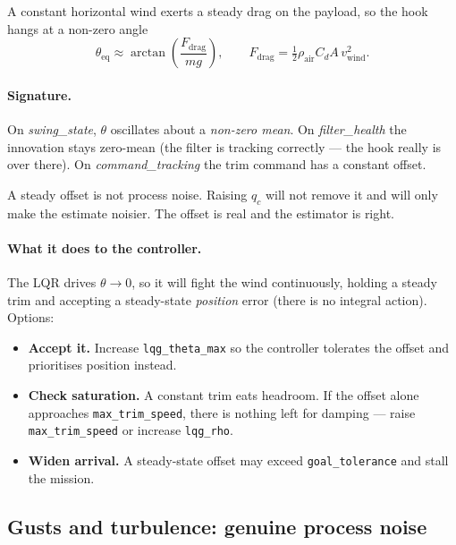 \documentclass[11pt,a4paper]{article}
\newcommand{\param}[1]{\texttt{\small #1}}
\newcommand{\plot}[1]{\textit{#1}}
\begin{document}
A constant horizontal wind exerts a steady drag on the payload, so the hook
hangs at a non-zero angle
%
\begin{equation}
\theta_{\text{eq}} \approx \arctan\!\left(\frac{F_{\text{drag}}}{m g}\right),
\qquad
F_{\text{drag}} = \tfrac{1}{2}\rho_{\text{air}} C_d A\, v_{\text{wind}}^2 .
\end{equation}

\paragraph{Signature.} On \plot{swing\_state}, $\theta$ oscillates about a
\emph{non-zero mean}. On \plot{filter\_health} the innovation stays zero-mean
(the filter is tracking correctly --- the hook really is over there). On
\plot{command\_tracking} the trim command has a constant offset.

\begin{tcolorbox}[colback=orange!5,colframe=orange!55!black,title=\textbf{Do not ``fix'' this with \param{qc}},fonttitle=\bfseries\small]
A steady offset is not process noise. Raising $q_c$ will not remove it and will
only make the estimate noisier. The offset is real and the estimator is right.
\end{tcolorbox}

\paragraph{What it does to the controller.} The LQR drives $\theta\to0$, so it
will fight the wind continuously, holding a steady trim and accepting a
steady-state \emph{position} error (there is no integral action). Options:
%
\begin{itemize}[nosep]
  \item \textbf{Accept it.} Increase \param{lqg\_theta\_max} so the controller
        tolerates the offset and prioritises position instead.
  \item \textbf{Check saturation.} A constant trim eats headroom. If the offset
        alone approaches \param{max\_trim\_speed}, there is nothing left for
        damping --- raise \param{max\_trim\_speed} or increase
        \param{lqg\_rho}.
  \item \textbf{Widen arrival.} A steady-state offset may exceed
        \param{goal\_tolerance} and stall the mission.
\end{itemize}

\subsection{Gusts and turbulence: genuine process noise}
\end{document}
